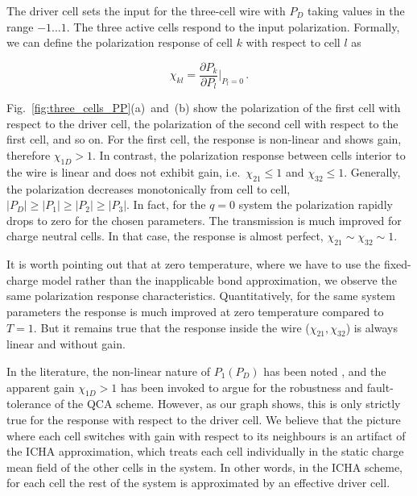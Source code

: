 
The driver cell sets the input for the three-cell wire with $P_D$ taking values
in the range $-1 \ldots 1$. The three active cells respond to the input
polarization. Formally, we can define the polarization response of cell $k$ with
respect to cell $l$ as

\begin{equation}
  \label{eq:polarization_response}
  \chi_{kl} = \frac{\partial P_k}{\partial P_l}\big|_{P_l = 0} \, .
\end{equation}

Fig.~\ref{fig:three_cells_PP}(a)~and~(b) show the polarization of the first cell
with respect to the driver cell, the polarization of the second cell with
respect to the first cell, and so on. For the first cell, the response is
non-linear and shows gain, therefore $\chi_{1D} > 1$. In contrast, the
polarization response between cells interior to the wire is linear and does not
exhibit gain, i.e.\ $\chi_{21} \le 1$ and $\chi_{32} \le 1$. Generally, the
polarization decreases monotonically from cell to cell, $|P_D| \ge |P_1| \ge
|P_2| \ge |P_3|$. In fact, for the $q=0$ system the polarization rapidly drops
to zero for the chosen parameters. The transmission is much improved for charge
neutral cells.  In that case, the response is almost perfect, $\chi_{21} \sim
\chi_{32} \sim 1$.

It is worth pointing out that at zero temperature, where we have to use the
fixed-charge model rather than the inapplicable bond approximation, we observe
the same polarization response characteristics. Quantitatively, for the same
system parameters the response is much improved at zero temperature compared to
$T=1$. But it remains true that the response inside the wire ($\chi_{21},
\chi_{32}$) is always linear and without gain.

In the literature, the non-linear nature of $P_1(P_D)$ has been noted
\cite{lent1993quantum} \cite{lent1993lines}, and the apparent gain $\chi_{1D} >
1$ has been invoked to argue for the robustness and fault-tolerance of the QCA
scheme. However, as our graph shows, this is only strictly true for the response
with respect to the driver cell. We believe that the picture where each cell
switches with gain with respect to its neighbours is an artifact of the ICHA
approximation, which treats each cell individually in the static charge mean
field of the other cells in the system. In other words, in the ICHA scheme, for
each cell the rest of the system is approximated by an effective driver cell.

